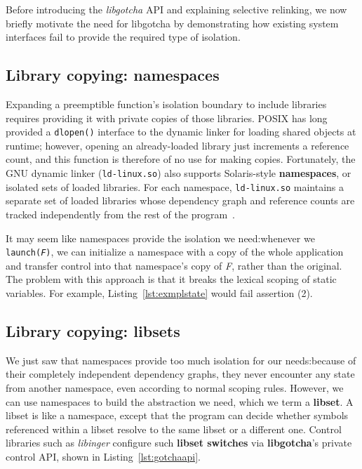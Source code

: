 Before introducing the \textit{libgotcha} API and explaining selective relinking, we
now briefly motivate the need for libgotcha by demonstrating how existing system
interfaces fail to provide the required type of isolation.


\subsection{Library copying: namespaces}
\label{sec:namespaces}

Expanding a preemptible function's isolation boundary to include libraries requires
providing it with private copies of those libraries.  POSIX has long provided a
\texttt{dlopen()} interface to the dynamic linker for loading shared objects at
runtime; however, opening an already-loaded library just increments
a reference count, and this function is therefore of no use for making copies.
Fortunately, the GNU dynamic linker (\texttt{ld-linux.so}) also supports
Solaris-style \textbf{namespaces}, or isolated sets of loaded libraries.  For each
namespace, \texttt{ld-linux.so} maintains a separate set of loaded libraries whose
dependency graph and reference counts are tracked independently from the rest of the
program~\cite{dlmopen-manpage}.

It may seem like namespaces provide the isolation we need:\@ whenever we
\texttt{launch(\textnormal{\textit{F}})}, we can initialize a namespace with a copy
of the whole application and transfer control into that namespace's copy of
\textit{F}, rather than the original.  The problem with this approach is that it
breaks the lexical scoping of static variables.  For example,
Listing~\ref{lst:exmplstate} would fail assertion (2).



\subsection{Library copying: libsets}
\label{sec:libsets}

We just saw that namespaces provide too much isolation
for our needs:\@ because of their completely independent dependency graphs, they
never encounter any state from another namespace, even according to normal scoping
rules.  However, we can use namespaces to build the abstraction we need, which we
term a \textbf{libset}.  A libset is like a namespace, except that the program can
decide whether symbols referenced within a libset resolve to the same
libset or a different one.  Control libraries such as \textit{libinger} configure such
\textbf{libset switches} via \textbf{libgotcha}'s private control API, shown
in Listing~\ref{lst:gotchaapi}.

